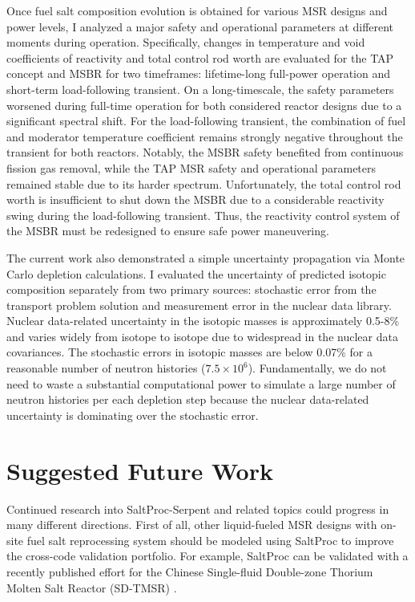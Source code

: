 Once fuel salt composition evolution is obtained for various \gls{MSR} 
designs and power levels, I analyzed a major safety and operational parameters 
at different moments during operation. Specifically, changes in temperature 
and void coefficients of reactivity and total control rod worth are evaluated 
for the \gls{TAP} concept and \gls{MSBR} for two timeframes: lifetime-long 
full-power operation and short-term load-following transient. On a 
long-timescale, the safety parameters worsened during full-time operation for 
both considered reactor designs due to a significant spectral shift. For the 
load-following transient, the combination of fuel and moderator temperature 
coefficient remains strongly negative throughout the transient for both 
reactors. Notably, the \gls{MSBR} safety benefited from continuous fission gas 
removal, while the \gls{TAP} \gls{MSR} safety and operational parameters 
remained stable due to its harder spectrum. Unfortunately, the total control 
rod worth is insufficient to shut down the \gls{MSBR} due to a considerable 
reactivity swing during the load-following transient. Thus, the reactivity 
control system of the \gls{MSBR} must be redesigned to ensure safe power 
maneuvering.

The current work also demonstrated a simple uncertainty propagation via Monte 
Carlo depletion calculations. I evaluated the uncertainty of predicted 
isotopic composition separately from two primary sources: stochastic error 
from the transport problem solution and measurement error in the nuclear data 
library. Nuclear data-related uncertainty in the isotopic masses is 
approximately 0.5-8\% and varies widely from isotope to isotope due to 
widespread in the nuclear data covariances. The stochastic errors in isotopic 
masses are below 0.07\% for a reasonable number of neutron histories 
($7.5\times 10^6$). Fundamentally, we do not need to waste
a substantial 
computational power to simulate a large number of neutron histories per each 
depletion step
because the nuclear data-related uncertainty is dominating over 
the stochastic error.




\section{Suggested Future Work}
Continued research into SaltProc-Serpent and related topics could progress
in many different directions. First of all, other liquid-fueled 
\gls{MSR} designs with on-site fuel salt reprocessing system should be modeled 
using SaltProc to improve the cross-code validation portfolio. For example, 
SaltProc can be validated with a recently published effort for the Chinese 
Single-fluid Double-zone Thorium Molten Salt Reactor (SD-TMSR) 
\cite{ASHRAF2019107115}.

